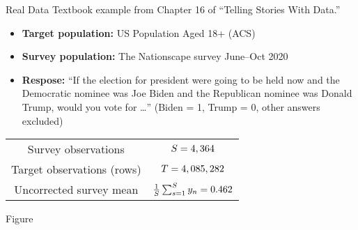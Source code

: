 
\begin{frame}{Real Data}
Textbook example from Chapter 16 of ``Telling Stories With Data.'' \citep{alexander:2023:telling}

\begin{itemize}
    \item \textbf{Target population:} US Population Aged 18+ (ACS) \citep{ipumsusa}
    \item \textbf{Survey population:} The Nationscape survey June--Oct 2020 \citep{tausanovitch:2019:democracy}
    \item \textbf{Respose:}  ``If
        the election for president were going to be held now and the Democratic
        nominee was Joe Biden and the Republican nominee was Donald Trump, would you
        vote for \ldots'' (Biden = 1, Trump = 0, other answers excluded)
\end{itemize}


\begin{tabular}{|c|c|}
    Survey observations &  $S = 4,364$  \\
    Target observations (rows) &  $T = 4,085,282$ \\
    Uncorrected survey mean & $\frac{1}{S} \sum_{s=1}^S y_n = 0.462$
\end{tabular}
%
\end{frame}

\begin{frame}{Figure}
\AlexanderBandFig{}
\end{frame}